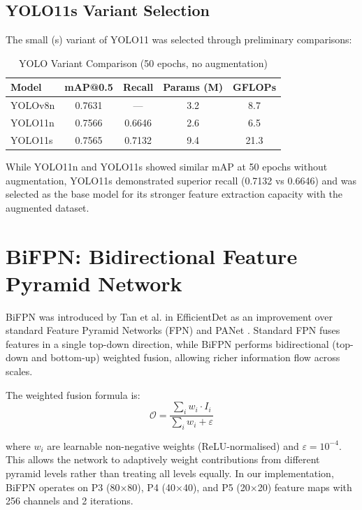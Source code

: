 \subsection{YOLO11s Variant Selection}

The small (s) variant of YOLO11 was selected through preliminary comparisons:

\begin{table}[H]
\centering
\caption{YOLO Variant Comparison (50 epochs, no augmentation)}
\label{tab:yolo_compare}
\begin{tabular}{lcccc}
\toprule
\textbf{Model} & \textbf{mAP@0.5} & \textbf{Recall} & \textbf{Params (M)} & \textbf{GFLOPs} \\
\midrule
YOLOv8n  & 0.7631 & ---    & 3.2  & 8.7  \\
YOLO11n & 0.7566 & 0.6646 & 2.6  & 6.5  \\
YOLO11s & 0.7565 & 0.7132 & 9.4  & 21.3 \\
\bottomrule
\end{tabular}
\end{table}

While YOLO11n and YOLO11s showed similar mAP at 50 epochs without augmentation, YOLO11s demonstrated superior recall (0.7132 vs 0.6646) and was selected as the base model for its stronger feature extraction capacity with the augmented dataset.

\section{BiFPN: Bidirectional Feature Pyramid Network}

BiFPN was introduced by Tan et al. in EfficientDet \cite{tan2020efficientdet} as an improvement over standard Feature Pyramid Networks (FPN) and PANet \cite{liu2018panet}. Standard FPN fuses features in a single top-down direction, while BiFPN performs bidirectional (top-down and bottom-up) weighted fusion, allowing richer information flow across scales.

The weighted fusion formula is:
\begin{equation}
\mathcal{O} = \frac{\sum_i w_i \cdot I_i}{\sum_i w_i + \varepsilon}
\end{equation}

where $w_i$ are learnable non-negative weights (ReLU-normalised) and $\varepsilon = 10^{-4}$. This allows the network to adaptively weight contributions from different pyramid levels rather than treating all levels equally. In our implementation, BiFPN operates on P3 (80$\times$80), P4 (40$\times$40), and P5 (20$\times$20) feature maps with 256 channels and 2 iterations.

